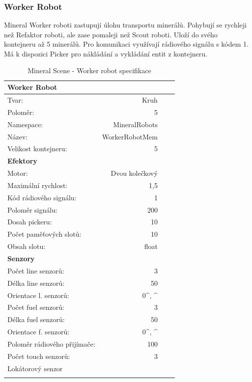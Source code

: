 \subsubsection{Worker Robot}
Mineral Worker roboti zastupují úlohu transportu minerálů. Pohybují se rychleji než Refaktor roboti, ale zase pomaleji než Scout roboti. Uloží do svého kontejneru až 5 minerálů. Pro komunikaci využívají rádiového signálu s kódem 1. Má k dispozici Picker pro nákládání a vykládání entit z kontejneru.
\begin{table}[h]\centering
	\begin{tabular}{l@{\hspace{1.0cm}}D{.}{,}{2.2}D{.}{,}{2.2}D{.}{,}{2.3}}
		\toprule
		\textbf{Worker Robot} \\
		\midrule
		Tvar: & Kruh\\
		Poloměr: & 5 \\
		Namespace: & MineralRobots\\
		Název: & WorkerRobotMem \\
		Velikost kontejneru: & 5\\
		\midrule
		\textbf{Efektory} \\
		\midrule
		Motor: & Dvou kolečkový \\
		Maximální rychlost: & 1,5 \\
		Kód rádiového signálu: & 1\\
		Poloměr signálu: & 200\\
		Dosah pickeru: & 10\\
		Počet paměťových slotů: &10 \\
		Obsah slotu: & float\\
		\midrule 
		\textbf{Senzory} \\
		\midrule
		Počet line senzorů: &  3\\
		Délka line senzorů: & 50\\
		Orientace l. senzorů: & 0^\circ, ^\circ\\
		Počet fuel senzorů: &  3\\
		Délka fuel senzorů: & 50\\
		Orientace f. senzorů: & 0^\circ, ^\circ\\
		Poloměr rádiového přijímače: & 100 \\
		Počet touch senzorů: & 3 \\  
		Lokátorový senzor\\ 
		\bottomrule
	\end{tabular}
	\caption{Mineral Scene - Worker robot specifikace }
	\label{tab04:MineralWorker}
\end{table}
\clearpage

